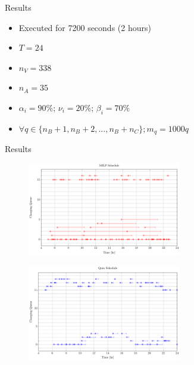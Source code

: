 \documentclass[bigger]{beamer}
\begin{document}
\begin{frame}[label={sec:org682ecc3}]{Results}
\begin{itemize}
\item Executed for 7200 seconds (2 hours)
\item \(T = 24\)
\item \(n_V = 338\)
\item \(n_A = 35\)
\item \(\alpha_i = 90\%\);  \(\nu_i = 20\%\);  \(\beta_i = 70\%\)
\item \(\forall q \in \{n_B + 1, n_B + 2,..., n_B + n_C \}; m_q = 1000q\)
\end{itemize}
\end{frame}

\begin{frame}[label={sec:org0c0a129}]{Results}
\begin{figure}[htpb]
\centering
    \includegraphics[width=0.6\textwidth]{img/schedule-milp-pap}
\end{figure}
\begin{figure}[htpb]
\centering
    \includegraphics[width=0.6\textwidth]{img/schedule-qin}
\end{figure}
\end{frame}
\end{document}
